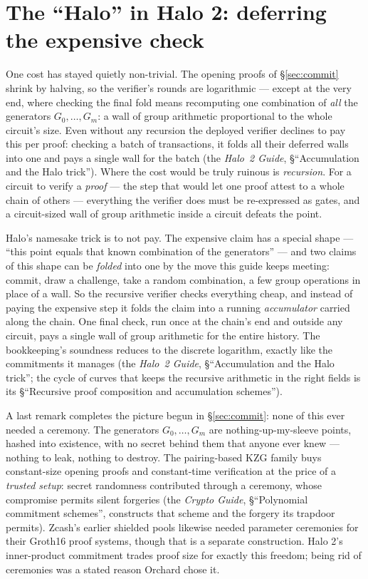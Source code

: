\documentclass[11pt,a4paper]{article}
\theoremstyle{definition}
\begin{document}
\section{The ``Halo'' in Halo 2: deferring the expensive check}\label{sec:halo}

One cost has stayed quietly non-trivial. The opening proofs of
\S\ref{sec:commit} shrink by halving, so the verifier's rounds are
logarithmic --- except at the very end, where checking the final fold
means recomputing one combination of \emph{all} the generators
$G_0, \dots, G_m$: a wall of group arithmetic proportional to the whole
circuit's size. Even without any recursion the deployed verifier
declines to pay this per proof: checking a batch of transactions, it
folds all their deferred walls into one and pays a single wall for the
batch (the \emph{Halo~2 Guide}, \S``Accumulation and the Halo trick'').
Where the cost would be truly ruinous is \emph{recursion}. For a
circuit to verify a \emph{proof} --- the step that would let one proof
attest to a whole chain of others --- everything the verifier does must
be re-expressed as gates, and a circuit-sized wall of group arithmetic
inside a circuit defeats the point.

Halo's namesake trick is to not pay. The expensive claim has a special
shape --- ``this point equals that known combination of the generators''
--- and two claims of this shape can be \emph{folded} into one by the
move this guide keeps meeting: commit, draw a challenge, take a random
combination, a few group operations in place of a wall. So the recursive
verifier checks everything cheap, and instead of paying the expensive
step it folds the claim into a running \emph{accumulator} carried along
the chain. One final check, run once at the chain's end and outside any
circuit, pays a single wall of group arithmetic for the entire history.
The bookkeeping's soundness reduces to the discrete logarithm, exactly
like the commitments it manages (the \emph{Halo~2 Guide},
\S``Accumulation and the Halo trick''; the cycle of curves that keeps
the recursive arithmetic in the right fields is its \S``Recursive proof
composition and accumulation schemes'').

A last remark completes the picture begun in \S\ref{sec:commit}: none of
this ever needed a ceremony. The generators $G_0, \dots, G_m$ are
nothing-up-my-sleeve points, hashed into existence, with no secret
behind them that anyone ever knew --- nothing to leak, nothing to
destroy. The pairing-based KZG family buys constant-size opening proofs and
constant-time verification at the price of a \emph{trusted setup}: secret
randomness contributed through a ceremony, whose compromise permits silent
forgeries (the \emph{Crypto Guide}, \S``Polynomial commitment schemes'',
constructs that scheme and the forgery its trapdoor permits). Zcash's earlier
shielded pools likewise needed parameter ceremonies for their Groth16 proof
systems, though that is a separate construction. Halo 2's inner-product
commitment trades proof size for exactly this freedom; being rid of
ceremonies was a stated reason Orchard chose it.
\end{document}
